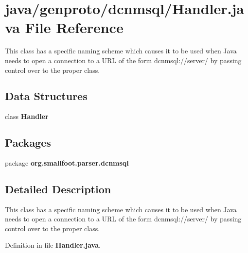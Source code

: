 \section{java/genproto/dcnmsql/\+Handler.java File Reference}
\label{dcnmsql_2Handler_8java}


This class has a specific naming scheme which causes it to be used when Java needs to open a connection to a U\+R\+L of the form dcnmsql\+://server/ by passing control over to the proper class.  


\subsection*{Data Structures}
\begin{DoxyCompactItemize}
\item 
class {\bf Handler}
\end{DoxyCompactItemize}
\subsection*{Packages}
\begin{DoxyCompactItemize}
\item 
package {\bf org.\+smallfoot.\+parser.\+dcnmsql}
\end{DoxyCompactItemize}


\subsection{Detailed Description}
This class has a specific naming scheme which causes it to be used when Java needs to open a connection to a U\+R\+L of the form dcnmsql\+://server/ by passing control over to the proper class. 



Definition in file {\bf Handler.\+java}.

